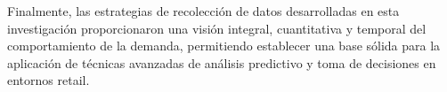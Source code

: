 			Finalmente, las estrategias de recolección de datos desarrolladas en esta investigación
			proporcionaron una visión integral, cuantitativa y temporal del comportamiento de la 
			demanda, permitiendo establecer una base sólida para la aplicación 
			de técnicas avanzadas de análisis predictivo y toma de decisiones en entornos retail.

		
